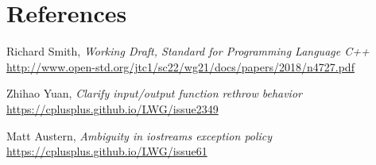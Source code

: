 \documentclass{wg21}
\begin{document}
\section{References}
\renewcommand{\section}[2]{}%
\begin{thebibliography}{9}

  Richard Smith,
  \emph{Working Draft, Standard for Programming Language C++}\newline
  \url{http://www.open-std.org/jtc1/sc22/wg21/docs/papers/2018/n4727.pdf}

  Zhihao Yuan,
  \emph{Clarify input/output function rethrow behavior}\newline
  \url{https://cplusplus.github.io/LWG/issue2349}

  Matt Austern,
  \emph{Ambiguity in iostreams exception policy}\newline
  \url{https://cplusplus.github.io/LWG/issue61}

\end{thebibliography}
\end{document}
